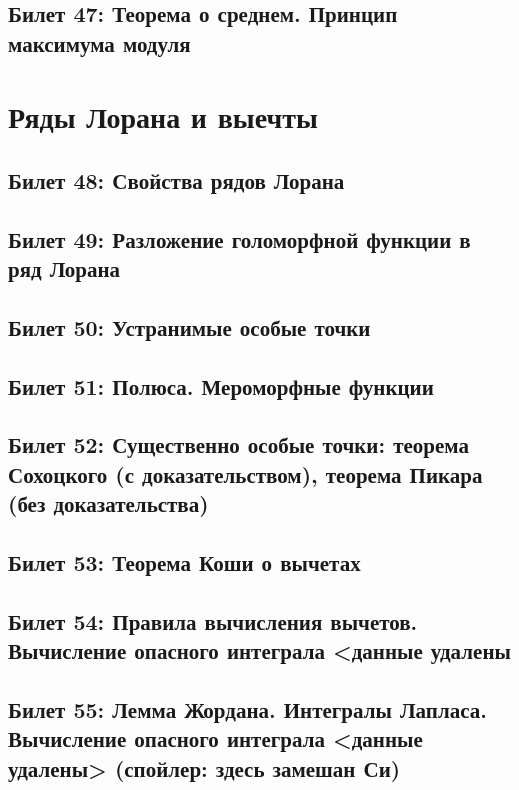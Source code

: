\documentclass[12pt, a4paper, oneside]{memoir}
\begin{document}
\subsection{Билет 47: Теорема о среднем. Принцип максимума модуля}




\section{Ряды Лорана и выечты}

\subsection{Билет 48: Свойства рядов Лорана}

\subsection{Билет 49: Разложение голоморфной функции в ряд Лорана}

\subsection{Билет 50: Устранимые особые точки}

\subsection{Билет 51: Полюса. Мероморфные функции}

\subsection{Билет 52: Существенно особые точки: теорема Сохоцкого (с доказательством), теорема Пикара (без доказательства)}

\subsection{Билет 53: Теорема Коши о вычетах}

\subsection{Билет 54: Правила вычисления вычетов. Вычисление опасного интеграла <данные удалены}

\subsection{Билет 55: Лемма Жордана. Интегралы Лапласа. Вычисление опасного интеграла <данные удалены> (спойлер: здесь замешан Си)}
\end{document}
